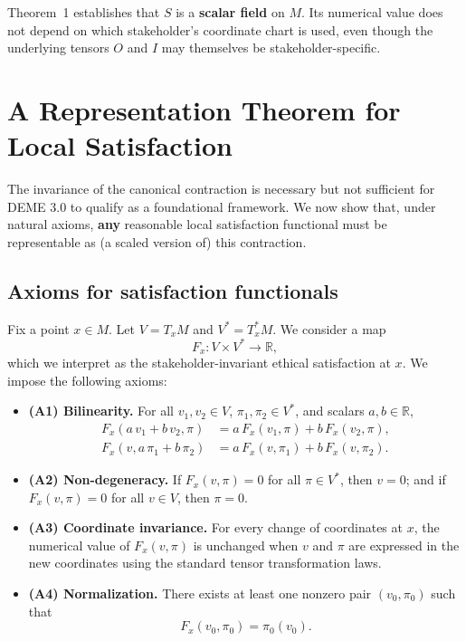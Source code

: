 \documentclass[12pt]{article}
\theoremstyle{remark}
\begin{document}
Theorem~1 establishes that $S$ is a \textbf{scalar field} on $M$. Its numerical value does not depend on which stakeholder's coordinate chart is used, even though the underlying tensors $O$ and $I$ may themselves be stakeholder-specific.

\section{A Representation Theorem for Local Satisfaction}

The invariance of the canonical contraction is necessary but not sufficient for DEME 3.0 to qualify as a foundational framework. We now show that, under natural axioms, \textbf{any} reasonable local satisfaction functional must be representable as (a scaled version of) this contraction.

\subsection{Axioms for satisfaction functionals}

Fix a point $x \in M$. Let $V = T_x M$ and $V^* = T_x^* M$. We consider a map
\begin{equation}
    F_x\colon V \times V^* \to \mathbb{R},
\end{equation}
which we interpret as the stakeholder-invariant ethical satisfaction at $x$. We impose the following axioms:

\begin{itemize}
    \item \textbf{(A1) Bilinearity.} For all $v_1, v_2 \in V$, $\pi_1, \pi_2 \in V^*$, and scalars $a, b \in \mathbb{R}$,
    \begin{align}
        F_x(a\, v_1 + b\, v_2, \pi) &= a\, F_x(v_1, \pi) + b\, F_x(v_2, \pi),\\
        F_x(v, a\, \pi_1 + b\, \pi_2) &= a\, F_x(v, \pi_1) + b\, F_x(v, \pi_2).
    \end{align}

    \item \textbf{(A2) Non-degeneracy.} If $F_x(v, \pi) = 0$ for all $\pi \in V^*$, then $v = 0$; and if $F_x(v, \pi) = 0$ for all $v \in V$, then $\pi = 0$.

    \item \textbf{(A3) Coordinate invariance.} For every change of coordinates at $x$, the numerical value of $F_x(v, \pi)$ is unchanged when $v$ and $\pi$ are expressed in the new coordinates using the standard tensor transformation laws.

    \item \textbf{(A4) Normalization.} There exists at least one nonzero pair $(v_0, \pi_0)$ such that
    \begin{equation}
        F_x(v_0, \pi_0) = \pi_0(v_0).
    \end{equation}
\end{itemize}
\end{document}
